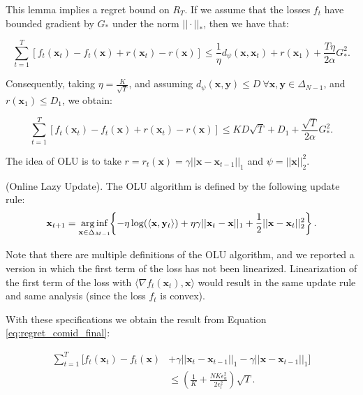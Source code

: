 This lemma implies a regret bound on $R_T$. If we assume that the losses $f_t$ have bounded gradient by $G_*$ under the norm $||\cdot||_*$, then we have that: 

\begin{equation}
\sum\limits_{t=1}^T[f_t(\mathbf x_t)-f_t(\mathbf x)+r(\mathbf x_t)-r(\mathbf x)]\le\frac{1}{\eta}d_\psi(\mathbf x,\mathbf x_t)+r(\mathbf x_1)+\frac{T\eta}{2\alpha}G_*^2.
\end{equation}

Consequently, taking $\eta=\frac{K}{\sqrt T}$, and assuming $d_\psi(\mathbf x,\mathbf y)\le D\ \forall\mathbf x,\mathbf y\in\Delta_{N-1}$, and $r(\mathbf x_1)\le D_1$, we obtain:

\begin{equation}\label{eq:regret_comid_final}
\sum\limits_{t=1}^T[f_t(\mathbf x_t)-f_t(\mathbf x)+r(\mathbf x_t)-r(\mathbf x)]\le KD\sqrt{T} + D_1+\frac{\sqrt{T}}{2\alpha}G_*^2.
\end{equation}

The idea of OLU is to take $r=r_t(\mathbf x)=\gamma||\mathbf x-\mathbf x_{t-1}||_1$ \cite{das2014online} and $\psi=||\mathbf x||_2^2$.

\begin{definition}(Online Lazy Update).\label{def:update_OLU}
The OLU algorithm is defined by the following update rule:
\begin{equation}\label{eq:update_OLU}
    \mathbf{x}_{t+1}=\arginf\limits_{\mathbf{x} \in \Delta_{M-1}} \hspace{-0.1cm} \left\{ -\eta\log(\langle \mathbf x,\mathbf y_t\rangle) + \eta \gamma ||\mathbf x_t-\mathbf x||_1 + \frac{1}{2}||\mathbf x-\mathbf x_t||^2_2 \right\}.
\end{equation}

\end{definition}

Note that there are multiple definitions of the OLU algorithm, and we reported a version in which the first term of the loss has not been linearized. Linearization of the first term of the loss with $\langle\nabla f_t(\mathbf x_t),\mathbf x\rangle$ would result in the same update rule and same analysis (since the loss $f_t$ is convex).

With these specifications we obtain the result from Equation \eqref{eq:regret_comid_final}:

\begin{equation}
\begin{aligned}
\sum\limits_{t=1}^T[f_t(\mathbf x_t)-f_t(\mathbf x)&+\gamma||\mathbf x_t-\mathbf x_{t-1}||_1-\gamma||\mathbf x-\mathbf x_{t-1}||_1]\\
&\le \left( \frac{1}{K} + \frac{N K \epsilon_u^2 }{2 \epsilon_l^2} \right) \sqrt{T}.
\end{aligned}
\end{equation}

